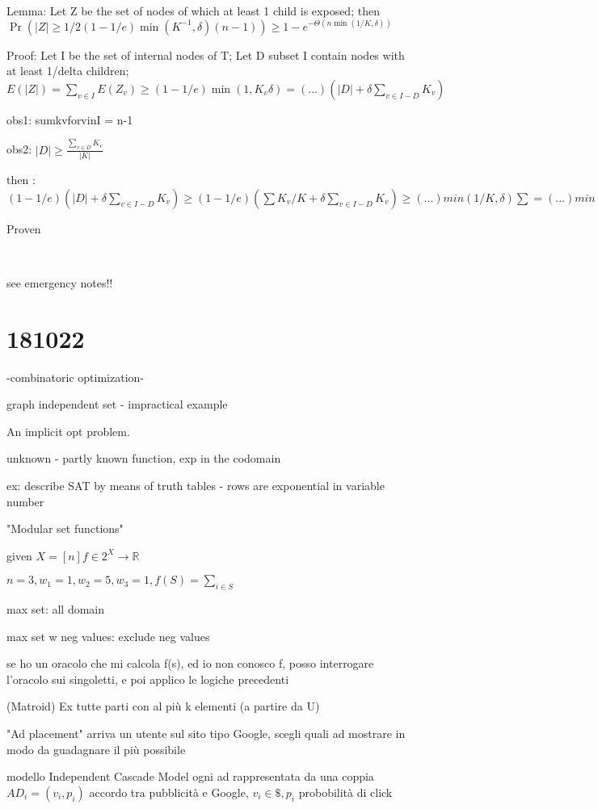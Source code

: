 \documentclass{report}
\begin{document}
	\
	
	Lemma: Let Z be the set of nodes of which at least 1 child is exposed; then $\Pr(|Z| \geq 1/2(1-1/e)\min(K^{-1}, \delta)(n-1))\geq 1-e^{-\Theta(n\min(1/K, \delta))}$
	
	Proof: Let I be the set of internal nodes of T; Let D subset I contain nodes with at least 1/delta children; $E(|Z|) = \sum_{v \in I}E(Z_v) \geq (1 - 1/e)\min(1, K_v\delta) = (...)(|D| + \delta\sum_{v \in I-D}K_v)$

	obs1: sumkvforvinI = n-1
	
	obs2: $|D| \geq \frac{\sum_{v \in D}K_v}{|K|}$
	
	then : $(1 - 1/e)(|D| + \delta\sum_{v \in I-D}K_v) \geq (1 - 1/e)(\sum K_v/K + \delta\sum_{v \in I-D}K_v) \geq (...)min(1/K, \delta)\sum = (...)min(...)(n-1)$
	
	Proven
	
	\
	
	see emergency notes!!
	
	\section{181022}
	
	-combinatoric optimization-
	
	graph independent set - impractical example
	
	An implicit opt problem.
	
	unknown - partly known function, exp in the codomain
	
	ex: describe SAT by means of truth tables - rows are exponential in variable number
	
	"Modular set functions"
	
	given $X=[n] f \in 2^X \to \mathbb{R}$
	
	$n=3, w_1 = 1, w_2 = 5, w_3 = 1, f(S)=\sum_{i \in S}$
	
	max  set: all domain
	
	max set w neg values: exclude neg values
	
	se ho un oracolo che mi calcola f(s), ed io non conosco f, posso interrogare l'oracolo sui singoletti, e poi applico le logiche precedenti
	
	(Matroid) Ex tutte parti con al più k elementi (a partire da U)
	
	"Ad placement"
	arriva un utente sul sito tipo Google, scegli quali ad mostrare in modo da guadagnare il più possibile
	
	modello Independent Cascade Model
	ogni ad rappresentata da una coppia $AD_i = (v_i, p_i)$ accordo tra pubblicità e Google, $v_i \in \$, p_i$ probobilità di click
	
\end{document}
